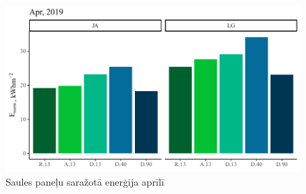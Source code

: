 \begin{figure}[h]
    \centering
    \includegraphics[width=\linewidth]{figures/sol_month/apr_m_m2.pdf}
    \caption{Saules paneļu saražotā enerģija aprīlī}
    \label{fig:apr_sum}
\end{figure}



%     

%     
